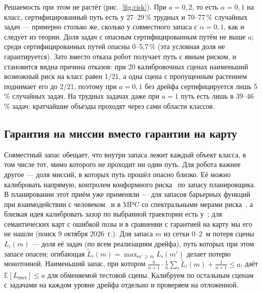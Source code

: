 Решаемость при этом не растёт (рис.~\ref{fig:risk}). При $a = 0{,}2$, то есть $\alpha = 0{,}1$ на класс, сертифицированный путь есть у 27--29\,\% трудных и 70--77\,\% случайных задач --- примерно столько же, сколько у совместного запаса с $\alpha = 0{,}1$, как и следует из теории. Доля задач с опасным сертифицированным путём не выше $a$; среди сертифицированных путей опасны 0--5,7\,\% (эта условная доля не гарантируется). Зато вместо отказа робот получает путь с явным риском, и становится видна причина отказов: при 20 калибровочных сценах наименьший возможный риск на класс равен 1/21, а одна сцена с пропущенным растением поднимает его до 2/21, поэтому при $a = 0{,}1$ без дрейфа сертифицируется лишь 5\,\% случайных задач. На трудных задачах даже при $a = 1$ путь есть лишь в 39--46\,\% задач: кратчайшие объезды проходят через сами области классов.

\subsection{Гарантия на миссии вместо гарантии на карту}\label{sec:crc}

\begin{table}[htbp]
\centering\scriptsize\setlength{\tabcolsep}{3.2pt}
\caption{Гарантии разной силы на одних и тех же задачах. Успех --- доля задач с путём, который не опасен и не задевает препятствий, при точной позе, 2 и 7~см; «опасн.» --- доля опасных миссий сцены: среднее по сценам / худшая сцена, наибольшее по уровням. Совместный запас и риск пути гарантируют каждый путь, риск планировщика --- ожидаемую долю опасных миссий в новой сцене; «по исполнению» --- с учётом дрейфа во время движения (разд.~\ref{sec:execution})}
\label{tab:crc}

\end{table}

Совместный запас обещает, что внутри запаса лежит каждый объект класса, в том числе тот, мимо которого не проходит ни один путь. Для робота важнее другое --- доля миссий, в которых путь прошёл опасно близко. Её можно калибровать напрямую, контролем конформного риска~\cite{crc} по запасу планировщика. В планировании этот приём уже применяли --- для запасов барьерных функций при взаимодействии с человеком~\cite{gonzales} и в MPC со спектральными мерами риска~\cite{eom}, а близкая идея калибровать зазор по выбранной траектории есть у~\cite{chang}; для семантических карт с ошибкой позы и в сравнении с гарантией на карту мы его не нашли (поиск 9 октября 2026~г.). Для запаса $m$ из сетки 0--2~м потеря сцены $L_i(m)$ --- доля её задач (по всем реализациям дрейфа), путь которых при этом запасе опасен; огибающая $\tilde L_i(m) = \max_{m' \ge m} L_i(m')$ делает потерю монотонной. Наименьший запас, при котором $\frac{n}{n+1}\cdot\frac1n\sum_i \tilde L_i(m) + \frac{1}{n+1} \le a$, даёт $\mathbb E[L_{\text{тест}}] \le a$ для обменяемой тестовой сцены. Калибруем по остальным сценам с задачами на каждом уровне дрейфа отдельно и проверяем на отложенной.

